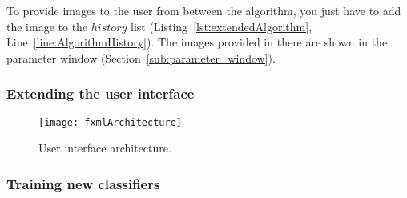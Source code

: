 To provide images to the user from between the algorithm, you just have to add the image to the $history$ list (Listing~\ref{lst:extendedAlgorithm}, Line~\ref{line:AlgorithmHistory}). The images provided in there are shown in the parameter window (Section~\ref{sub:parameter_window}).

\subsubsection{Extending the user interface}

\begin{figure}[h]
	\centering
	\texttt{[image: fxmlArchitecture]}
	\caption{User interface architecture.}
	\label{fig:fxmlArchitecture}
\end{figure}

\subsubsection{Training new classifiers}